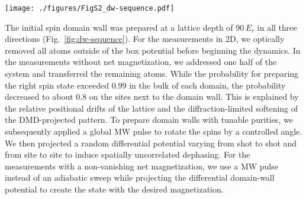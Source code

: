 \documentclass[
 reprint,
 superscriptaddress,
 amsmath,amssymb,
 aps,
 pra,
]{revtex4-2}
\begin{document}
\begin{figure*}
    \centering
    \texttt{[image: ./figures/FigS2\_dw-sequence.pdf]}
    \caption{\textbf{Domain-wall preparation sequence.}
        Initial domain-wall preparation starts in the $\left|\downarrow\right>$ polarized state in a deep lattice. The values in the light gray boxes denote the targeted average spin $2 S^z$ on the left and the right side of the domain wall, respectively. Dark-coloured boxes indicate operations performed on the atoms on each domain wall side.
        (\textbf{A}) Unmagnetized domain-wall preparation. A fully polarized domain wall is created using the tune-out DMD laser to shift the spin-flip transition. An adiabatic MW sweep transfers the spins on the unaddressed side. Then a global MW pulse reduces the $S^z$ domain wall contrast and a spatially random tune-out DMD potential locally dephases all spins.
        (\textbf{B}) (Fully) magnetized domain wall preparation. Since one domain wall side is kept polarized, the contrast reducing MW pulse is only applied to one side. As before, the dephasing potential is applied subsequently.
    }
    \label{fig:dw-sequence}
\end{figure*}

The initial spin domain wall was prepared at a lattice depth of $90\,E_r$ in all three directions (Fig.~\ref{fig:dw-sequence}).
For the measurements in 2D, we optically removed all atoms outside of the box potential before beginning the dynamics.
In the measurements without net magnetization, we addressed one half of the system and transferred the remaining atoms.
While the probability for preparing the right spin state exceeded $0.99$ in the bulk of each domain, the probability decreased to about $0.8$ on the sites next to the domain wall.
This is explained by the relative positional drifts of the lattice and the diffraction-limited softening of the DMD-projected pattern.
To prepare domain walls with tunable purities, we subsequently applied a global MW pulse to rotate the spins by a controlled angle.
We then projected a random differential potential varying from shot to shot and from site to site to induce spatially uncorrelated dephasing.
For the measurements with a non-vanishing net magnetization, we use a MW pulse instead of an adiabatic sweep while projecting the differential domain-wall potential to create the state with the desired magnetization. 
\end{document}
